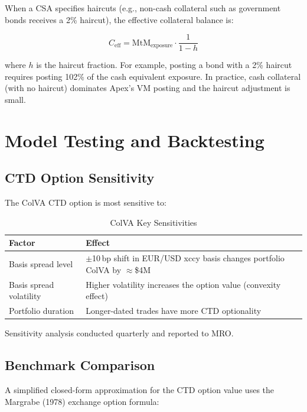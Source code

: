 \documentclass[11pt,a4paper]{article}
\begin{document}
When a CSA specifies haircuts (e.g., non-cash collateral such as government bonds receives a 2\%
haircut), the effective collateral balance is:

\begin{equation}
C_{\mathrm{eff}} = \mathrm{MtM}_{\mathrm{exposure}} \cdot \frac{1}{1 - h}
\tag{7}
\end{equation}

where $h$ is the haircut fraction. For example, posting a bond with a 2\% haircut requires
posting 102\% of the cash equivalent exposure. In practice, cash collateral (with no haircut)
dominates Apex's VM posting and the haircut adjustment is small.

\section{Model Testing and Backtesting}

\subsection{CTD Option Sensitivity}

The ColVA CTD option is most sensitive to:

\begin{table}[h!]
\centering
\caption{ColVA Key Sensitivities}
\begin{tabular}{@{}lp{9cm}@{}}
\toprule
\textbf{Factor} & \textbf{Effect} \\
\midrule
Basis spread level & $\pm$10\,bp shift in EUR/USD xccy basis changes portfolio ColVA by $\approx$\$4M \\
Basis spread volatility & Higher volatility increases the option value (convexity effect) \\
Portfolio duration & Longer-dated trades have more CTD optionality \\
\bottomrule
\end{tabular}
\end{table}

Sensitivity analysis conducted quarterly and reported to MRO.

\subsection{Benchmark Comparison}

A simplified closed-form approximation for the CTD option value uses the Margrabe (1978)
exchange option formula:
\end{document}
